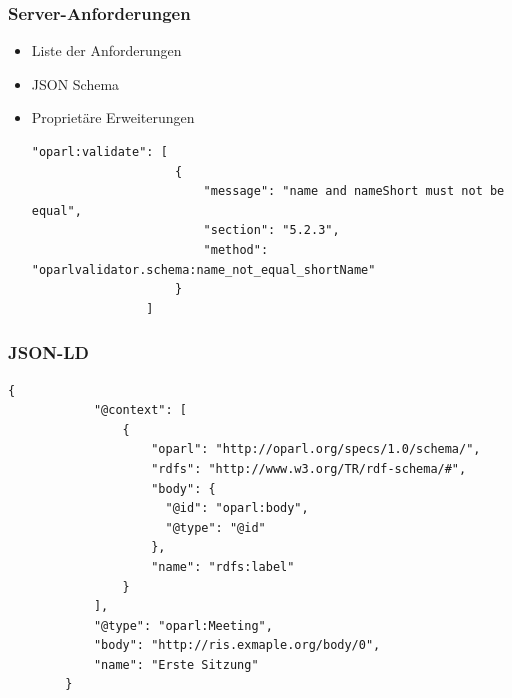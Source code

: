 \documentclass{beamer}
\begin{document}

\begin{frame}[fragile]
    \frametitle{Server-Anforderungen}
    \begin{itemize}
        \item Liste der Anforderungen
        \item JSON Schema
        \item Proprietäre Erweiterungen
            \begin{lstlisting}[basicstyle=\footnotesize\tt, xleftmargin=-64pt]
                "oparl:validate": [
                    {
                        "message": "name and nameShort must not be equal",
                        "section": "5.2.3",
                        "method": "oparlvalidator.schema:name_not_equal_shortName"
                    }
                ]
            \end{lstlisting}
    \end{itemize}
\end{frame}


\begin{frame}[fragile]
    \frametitle{JSON-LD}

    \begin{lstlisting}[basicstyle=\footnotesize\tt, xleftmargin=-32pt]
        {
            "@context": [
                {
                    "oparl": "http://oparl.org/specs/1.0/schema/",
                    "rdfs": "http://www.w3.org/TR/rdf-schema/#",
                    "body": {
                      "@id": "oparl:body",
                      "@type": "@id"
                    },
                    "name": "rdfs:label"
                }
            ],
            "@type": "oparl:Meeting",
            "body": "http://ris.exmaple.org/body/0",
            "name": "Erste Sitzung"
        }
    \end{lstlisting}
\end{frame}
\end{document}
